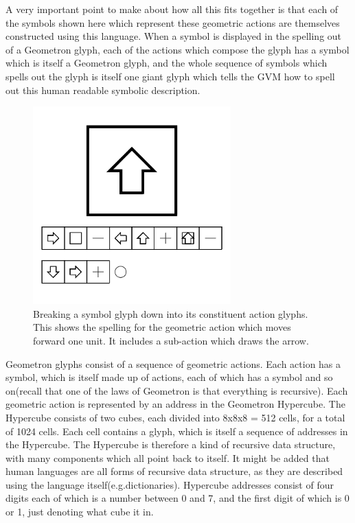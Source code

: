   
A very important point to make about how all this fits together is that each of the symbols shown here which represent these geometric actions are themselves constructed using this language.  When a symbol is displayed in the spelling out of a Geometron glyph, each of the actions which compose the glyph has a symbol which is itself a Geometron glyph, and the whole sequence of symbols which spells out the glyph is itself one giant glyph which tells the GVM how to spell out this human readable symbolic description.  

\begin{figure}
	\centering
	\includegraphics[width=3in]{figures/symbol/uparrowspelling.png}
	\caption[uparrowspelling]
	{Breaking a symbol glyph down into its constituent action glyphs.  This shows the spelling for the geometric action which moves forward one unit.  It includes a sub-action which draws the arrow.}
\end{figure}



Geometron glyphs consist of a sequence of geometric actions.  Each action has a symbol, which is itself made up of actions, each of which has a symbol and so on(recall that one of the laws of Geometron is that everything is recursive). Each geometric action is represented by an address in the Geometron Hypercube.  The Hypercube consists of two cubes, each divided into 8x8x8 = 512 cells, for a total of 1024 cells.  Each cell contains a glyph, which is itself a sequence of addresses in the Hypercube.  The Hypercube is therefore a kind of recursive data structure, with many components which all point back to itself.  It might be added that human languages are all forms of recursive data structure, as they are described using the language itself(e.g.dictionaries).  Hypercube addresses consist of four digits each of which is a number between 0 and 7, and the first digit of which is 0 or 1, just denoting what cube it in.

